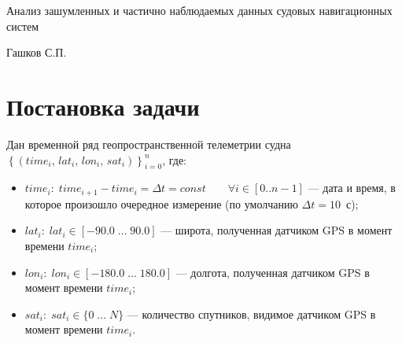 \documentclass[a4paper,12pt]{report}
\begin{document}

	\thispagestyle{empty}
	{ \large
		\begin{center}
			\renewcommand{\baselinestretch}{1.2}
			\Large
			{\Large Анализ зашумленных и частично наблюдаемых данных судовых навигационных систем}
		\end{center}
		\medskip%

		\vspace{3\bigskipamount}%
		\begin{flushright}
			\begin{minipage}{0.5\textwidth}
				\begin{flushleft}
					Гашков С.П.
				\end{flushleft}
			\end{minipage}
		\end{flushright}

		\vfill%
	}


	\large

	\onehalfspacing

	\clearpage
	\renewcommand{\thesection}{\arabic{section}}
	\graphicspath{{../pict/}}

	\tableofcontents
	\newpage

	\section{Постановка задачи}
	Дан временной ряд геопространственной телеметрии судна
	$\left\{\left(\mathit{time}_i,\, \mathit{lat}_i,\, \mathit{lon}_i,\, \mathit{sat}_i \right) \right\}_{i=0}^{n}$, где:
	\begin{itemize}
		\item $time_i: \; time_{i+1} - time_i = \Delta t = const \qquad \forall i \in [0..n-1]$ --- дата и время, в которое произошло очередное измерение (по умолчанию $\Delta t = 10$~с);
		\item $lat_i: \; lat_i \in [-90.0 \; \ldots \; 90.0]$ --- широта, полученная датчиком GPS в момент времени $time_i$;
		\item $lon_i: \; lon_i \in [-180.0 \; \ldots \; 180.0]$ --- долгота, полученная датчиком GPS в момент времени $time_i$;
		\item $sat_i: \; sat_i \in \{0 \; \ldots \; N\}$ --- количество спутников, видимое датчиком GPS в момент времени $time_i$.
	\end{itemize}
\end{document}
